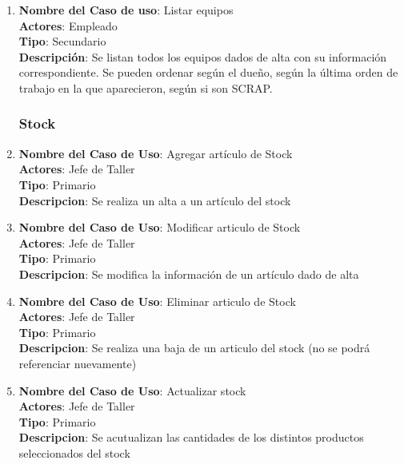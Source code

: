 \documentclass[12pt]{extarticle}
\begin{document}
\begin{spacing}{1.2}
\begin{enumerate}
            \item 	\textbf{Nombre del Caso de uso}: Listar equipos\\
                    \textbf{Actores}: Empleado\\
                    \textbf{Tipo}: Secundario\\
                    \textbf{Descripción}: Se listan todos los equipos dados de alta con su información correspondiente. Se pueden ordenar según el dueño, según la última orden de trabajo en la que aparecieron, según si son SCRAP.



            \subsubsection{Stock}



            \item 	\textbf{Nombre del Caso de Uso}: Agregar artículo de Stock\\
                    \textbf{Actores}: Jefe de Taller\\
                    \textbf{Tipo}: Primario\\
                    \textbf{Descripcion}: Se realiza un alta a un artículo del stock

            \item 	\textbf{Nombre del Caso de Uso}: Modificar articulo de Stock\\
                    \textbf{Actores}: Jefe de Taller\\
                    \textbf{Tipo}: Primario\\
                    \textbf{Descripcion}: Se modifica la información de un artículo dado de alta

            \item 	\textbf{Nombre del Caso de Uso}: Eliminar articulo de Stock\\
                    \textbf{Actores}: Jefe de Taller\\
                    \textbf{Tipo}: Primario\\
                    \textbf{Descripcion}: Se realiza una baja de un articulo del stock (no se podrá referenciar nuevamente)

            \item 	\textbf{Nombre del Caso de Uso}: Actualizar stock\\
                    \textbf{Actores}: Jefe de Taller\\
                    \textbf{Tipo}: Primario\\
                    \textbf{Descripcion}: Se acutualizan las cantidades de los distintos productos seleccionados del stock


\end{enumerate}
\end{spacing}
\end{document}
